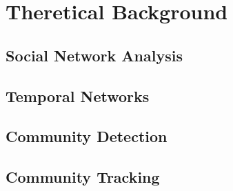 \chapter{Theretical Background}


\section{Social Network Analysis}

\section{Temporal Networks}

\section{Community Detection}

\section{Community Tracking}